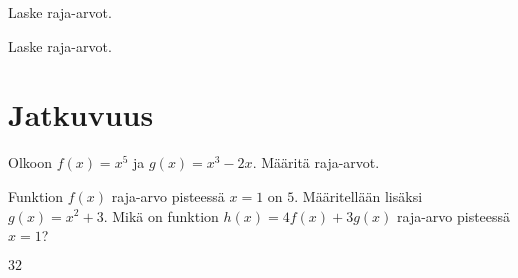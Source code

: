 \begin{tehtavasivu}

\begin{tehtava}
Laske raja-arvot.
\begin{vastaus}
\end{vastaus}
\end{tehtava}

\begin{tehtava}
Laske raja-arvot.
\begin{vastaus}
\end{vastaus}
\end{tehtava}

\end{tehtavasivu}



\section{Jatkuvuus}

\begin{tehtavasivu}


\begin{tehtava}
	Olkoon $f(x)=x^5$ ja $g(x)=x^3-2x$. Määritä raja-arvot.
	\begin{alakohdat}
	\end{alakohdat}
	\begin{vastaus}
		\begin{alakohdat}
			\alakohta{$32$}
			\alakohta{$4$}
			\alakohta{$36$}
			\alakohta{$128$}
		\end{alakohdat}
	\end{vastaus}
\end{tehtava}

\begin{tehtava}
	Funktion $f(x)$ raja-arvo pisteessä $x=1$ on $5$. Määritellään lisäksi $g(x) = x^2+3$. Mikä on funktion $h(x) = 4f(x) + 3g(x)$ raja-arvo pisteessä $x=1$?
	\begin{vastaus}
		$32$
	\end{vastaus}
\end{tehtava}

\end{tehtavasivu}
